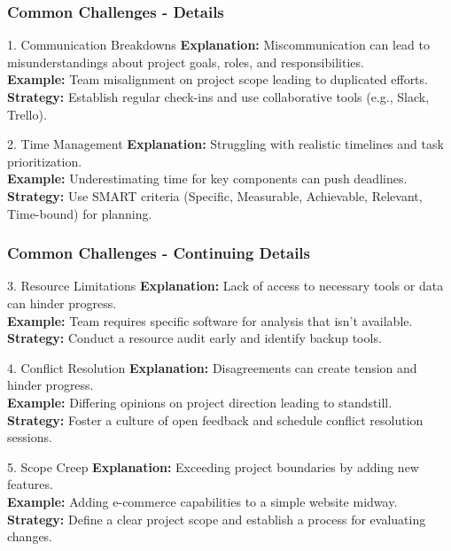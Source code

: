 \documentclass[aspectratio=169]{beamer}
\begin{document}
\begin{frame}[fragile]
    \frametitle{Common Challenges - Details}
    
    \begin{block}{1. Communication Breakdowns}
        \textbf{Explanation:} Miscommunication can lead to misunderstandings about project goals, roles, and responsibilities.\\
        \textbf{Example:} Team misalignment on project scope leading to duplicated efforts.\\
        \textbf{Strategy:} Establish regular check-ins and use collaborative tools (e.g., Slack, Trello).
    \end{block}
    
    \begin{block}{2. Time Management}
        \textbf{Explanation:} Struggling with realistic timelines and task prioritization.\\
        \textbf{Example:} Underestimating time for key components can push deadlines.\\
        \textbf{Strategy:} Use SMART criteria (Specific, Measurable, Achievable, Relevant, Time-bound) for planning.
    \end{block}
\end{frame}

\begin{frame}[fragile]
    \frametitle{Common Challenges - Continuing Details}

    \begin{block}{3. Resource Limitations}
        \textbf{Explanation:} Lack of access to necessary tools or data can hinder progress.\\
        \textbf{Example:} Team requires specific software for analysis that isn't available.\\
        \textbf{Strategy:} Conduct a resource audit early and identify backup tools.
    \end{block}
    
    \begin{block}{4. Conflict Resolution}
        \textbf{Explanation:} Disagreements can create tension and hinder progress.\\
        \textbf{Example:} Differing opinions on project direction leading to standstill.\\
        \textbf{Strategy:} Foster a culture of open feedback and schedule conflict resolution sessions.
    \end{block}
    
    \begin{block}{5. Scope Creep}
        \textbf{Explanation:} Exceeding project boundaries by adding new features.\\
        \textbf{Example:} Adding e-commerce capabilities to a simple website midway.\\
        \textbf{Strategy:} Define a clear project scope and establish a process for evaluating changes.
    \end{block}
\end{frame}
\end{document}
